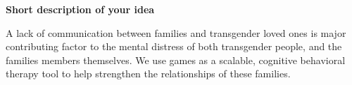 \textbf{Short description of your idea}

A lack of communication between families and transgender loved ones is major contributing factor to the mental distress of both transgender people, and the families members themselves. We use games as a scalable, cognitive behavioral therapy tool to help strengthen the relationships of these families. 